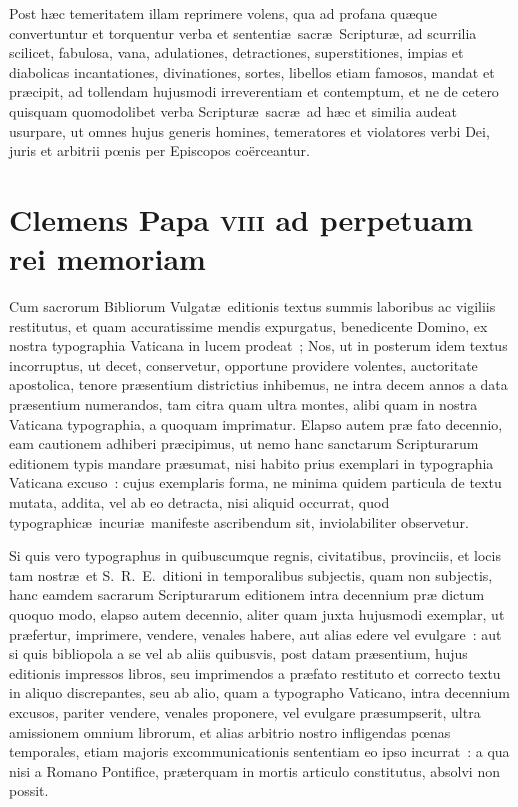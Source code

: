 Post h\ae c temeritatem illam reprimere volens, qua ad profana qu\ae que 
convertuntur et torquentur verba et sententi\ae\ sacr\ae\ Scriptur\ae, ad 
scurrilia scilicet, fabulosa, vana, adulationes, detractiones, superstitiones, 
impias et diabolicas incantationes, divinationes, sortes, libellos etiam 
famosos, mandat et pr\ae cipit, ad tollendam hujusmodi irreverentiam et 
contemptum, et ne de cetero quisquam quomodolibet verba Scriptur\ae\ 
sacr\ae\ ad h\ae c et similia audeat usurpare, ut omnes hujus generis 
homines, temeratores et violatores verbi Dei, juris et arbitrii p\oe nis per 
Episcopos co\"erceantur.


\clearpage%
{\centering \section*{Clemens Papa \textsc{viii} ad perpetuam rei memoriam}}
\addcontentsline{toc}{subsection}{Constitutio Clementis viii}
\noindent Cum sacrorum Bibliorum Vulgat\ae\ editionis textus summis laboribus 
ac vigiliis restitutus, et quam accuratissime mendis expurgatus, benedicente 
Domino, ex nostra typographia Vaticana in lucem prodeat~; Nos, ut in posterum 
idem textus incorruptus, ut decet, conservetur, opportune providere volentes, 
auctoritate apostolica, tenore pr\ae sentium districtius inhibemus, ne intra 
decem annos a data pr\ae sentium numerandos, tam citra quam ultra montes, alibi 
quam in nostra Vaticana typographia, a quoquam imprimatur. Elapso autem pr\ae 
fato decennio, eam cautionem adhiberi pr\ae cipimus, ut nemo hanc sanctarum 
Scripturarum editionem typis mandare pr\ae sumat, nisi habito prius exemplari 
in typographia Vaticana excuso~: cujus exemplaris forma, ne minima quidem 
particula de textu mutata, addita, vel ab eo detracta, nisi aliquid occurrat, 
quod typographic\ae\ incuri\ae\ manifeste ascribendum sit, inviolabiliter 
observetur. 

Si quis vero typographus in quibuscumque regnis, civitatibus, provinciis, et 
locis tam nostr\ae\ et S.\ R.\ E.\ ditioni in temporalibus subjectis, quam non 
subjectis, hanc eamdem sacrarum Scripturarum editionem intra decennium pr\ae 
dictum quoquo modo, elapso autem decennio, aliter quam juxta hujusmodi 
exemplar, ut pr\ae fertur, imprimere, vendere, venales habere, aut alias edere 
vel evulgare~: aut si quis bibliopola a se vel ab aliis quibusvis, post datam 
pr\ae sentium, hujus editionis impressos libros, seu imprimendos a pr\ae fato 
restituto et correcto textu in aliquo discrepantes, seu ab alio, quam a 
typographo Vaticano, intra decennium excusos, pariter vendere, venales 
proponere, vel evulgare pr\ae sumpserit, ultra amissionem omnium librorum, et 
alias arbitrio nostro infligendas p\oe nas temporales, etiam majoris 
excommunicationis sententiam eo ipso incurrat~: a qua nisi a Romano Pontifice, 
pr\ae terquam in mortis articulo constitutus, absolvi non possit. 

